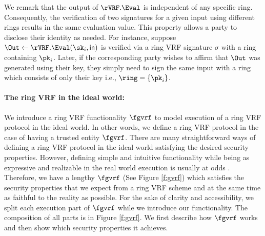 We remark that the output of $\rVRF.\Eval$ is independent of any specific ring.  Consequently, the verification of two signatures for a given input using different rings results in the same evaluation value.  This property allows a party to disclose their identity as needed.  For instance, suppose $\Out \leftarrow \rVRF.\Eval(\sk_i, \msg)$ is verified via a ring VRF signature $\sigma$ with a ring containing $\pk_i$.  Later, if the corresponding party wishes to affirm that $\Out$ was generated using their key, they simply need to sign the same input with a ring which consists of only their key i.e., $ \ring = \{\pk_i\} $.







\paragraph{The ring VRF in the ideal world:} We introduce a ring VRF functionality $ \fgvrf $ to model execution of a ring VRF protocol in the ideal world. In other words, we define a ring VRF protocol in the case of having a trusted entity $ \fgvrf $. There are many straightforward ways of defining a ring VRF protocol in the ideal world satisfying the desired security properties. However, defining simple and intuitive functionality while being as expressive and realizable in the real world execution is usually at odds \cite{canetti1}. Therefore, we have a lengthy $ \fgvrf $ (See Figure \ref{f:gvrf}) which satisfies the security properties that we expect from a ring VRF scheme and at the same time as faithful to the reality as possible. For the sake of clarity and accessibility, we split each execution part of $ \fgvrf $ while we introduce our functionality. The composition of all parts is in Figure \ref{f:gvrf}. We first describe how $  \fgvrf $ works and then show which security properties it achieves.


